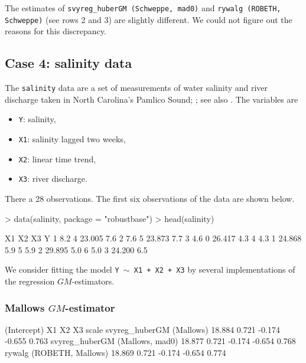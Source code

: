 \documentclass[a4paper,oneside,11pt,DIV=12]{scrartcl}
\newcommand{\code}[1]{{\texttt{#1}}}
\begin{document}
\noindent The estimates of \code{svyreg\_huberGM (Schweppe, mad0)} and
\code{rywalg (ROBETH, Schweppe)} (see rows 2 and 3) are slightly
different. We could not figure out the reasons for this discrepancy.


\subsection{Case 4: salinity data}
The \code{salinity} data are a set of measurements of water salinity
and river discharge taken in North Carolina's Pamlico Sound;
\cite{ruppertcarroll}; see also \cite{rousseeuwleroy}. The variables are

\begin{itemize}
    \item \code{Y}: salinity,
    \item \code{X1}: salinity lagged two weeks,
    \item \code{X2}: linear time trend,
    \item \code{X3}: river discharge.
\end{itemize}

\noindent There a 28 observations. The first six observations of the data
are shown below.

\begin{Schunk}
\begin{Sinput}
> data(salinity, package = "robustbase")
> head(salinity)
\end{Sinput}
\begin{Soutput}
   X1 X2     X3   Y
1 8.2  4 23.005 7.6
2 7.6  5 23.873 7.7
3 4.6  0 26.417 4.3
4 4.3  1 24.868 5.9
5 5.9  2 29.895 5.0
6 5.0  3 24.200 6.5
\end{Soutput}
\end{Schunk}

\noindent We consider fitting the model \code{Y $\sim$ X1 + X2 + X3}
by several implementations of the regression $GM$-estimators.

\subsubsection{Mallows $GM$-estimator}
\begin{Schunk}
\begin{Soutput}
                               (Intercept)    X1     X2     X3 scale
svyreg_huberGM (Mallows)            18.884 0.721 -0.174 -0.655 0.763
svyreg_huberGM (Mallows, mad0)      18.877 0.721 -0.174 -0.654 0.768
rywalg (ROBETH, Mallows)            18.869 0.721 -0.174 -0.654 0.774
\end{Soutput}
\end{Schunk}
\end{document}

